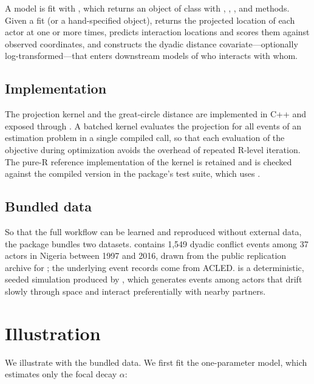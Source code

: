 A model is fit with , which returns an object of class
 with , , , and 
methods. Given a fit (or a hand-specified  object),
 returns the projected location of each actor at one or more
times,  predicts interaction locations and scores
them against observed coordinates, and  constructs the dyadic
distance covariate---optionally log-transformed---that enters downstream models of
who interacts with whom.

\subsection{Implementation}

The projection kernel and the great-circle distance are implemented in C++ and
exposed through . A batched kernel evaluates the projection for all
events of an estimation problem in a single compiled call, so that each evaluation
of the objective during optimization avoids the overhead of repeated R-level
iteration. The pure-R reference implementation of the kernel is retained and is
checked against the compiled version in the package's test suite, which uses
.

\subsection{Bundled data}

So that the full workflow can be learned and reproduced without external data, the
package bundles two datasets.  contains 1,549 dyadic conflict
events among 37 actors in Nigeria between 1997 and 2016, drawn from the public
replication archive for \citet{kim2023pals}; the underlying event records come
from ACLED.  is a deterministic, seeded simulation produced by
, which generates events among actors that drift
slowly through space and interact preferentially with nearby partners.

\section{Illustration}

We illustrate  with the bundled  data. We first fit
the one-parameter model, which estimates only the focal decay $\alpha$:

